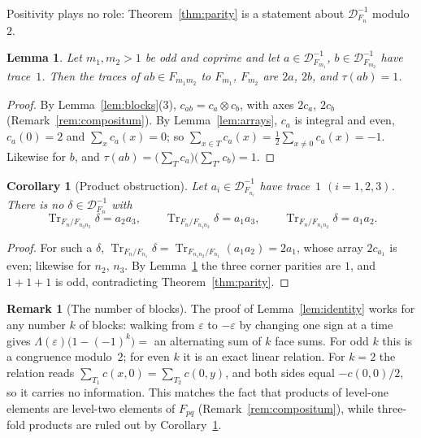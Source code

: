 \documentclass[11pt]{amsart}
\newcommand{\cod}[1]{\mathcal{D}_{#1}^{-1}}
\DeclareMathOperator{\Tr}{Tr}
\theoremstyle{plain}
\newtheorem{lemma}[theorem]{Lemma}
\newtheorem{corollary}[theorem]{Corollary}
\theoremstyle{definition}
\newtheorem{remark}[theorem]{Remark}
\begin{document}
Positivity plays no role: Theorem~\ref{thm:parity} is a statement about $\cod{F_n}$ modulo~$2$.

\begin{lemma}\label{lem:product-tau}
Let $m_1, m_2 > 1$ be odd and coprime and let $a \in \cod{F_{m_1}}$, $b \in \cod{F_{m_2}}$ have
trace~$1$. Then the traces of $ab \in F_{m_1m_2}$ to $F_{m_1}$, $F_{m_2}$ are $2a$, $2b$, and
$\tau(ab) = 1$.
\end{lemma}

\begin{proof}
By Lemma~\ref{lem:blocks}(3), $c_{ab} = c_a \otimes c_b$, with axes $2c_a$, $2c_b$
(Remark~\ref{rem:compositum}). By Lemma~\ref{lem:arrays}, $c_a$ is integral and even,
$c_a(0) = 2$ and $\sum_x c_a(x) = 0$; so $\sum_{x \in T} c_a(x) = \frac12\sum_{x \neq 0}c_a(x) = -1$.
Likewise for $b$, and $\tau(ab) = \bigl(\sum_T c_a\bigr)\bigl(\sum_{T'} c_b\bigr) = 1$.
\end{proof}

\begin{corollary}[Product obstruction]\label{cor:products}
Let $a_i \in \cod{F_{n_i}}$ have trace~$1$ $(i = 1,2,3)$. There is no $\delta \in \cod{F_n}$ with
\[
  \Tr_{F_n/F_{n_2n_3}}\delta = a_2a_3,\qquad \Tr_{F_n/F_{n_1n_3}}\delta = a_1a_3,\qquad
  \Tr_{F_n/F_{n_1n_2}}\delta = a_1a_2 .
\]
\end{corollary}

\begin{proof}
For such a $\delta$, $\Tr_{F_n/F_{n_1}}\delta = \Tr_{F_{n_1n_2}/F_{n_1}}(a_1a_2) = 2a_1$, whose array
$2c_{a_1}$ is even; likewise for $n_2$, $n_3$. By Lemma~\ref{lem:product-tau} the three corner
parities are $1$, and $1 + 1 + 1$ is odd, contradicting Theorem~\ref{thm:parity}.
\end{proof}

\begin{remark}[The number of blocks]\label{rem:blocks}
The proof of Lemma~\ref{lem:identity} works for any number $k$ of blocks: walking from
$\varepsilon$ to $-\varepsilon$ by changing one sign at a time gives
$\Lambda(\varepsilon)\bigl(1 - (-1)^k\bigr) = $ an alternating sum of $k$ face sums. For odd $k$
this is a congruence modulo~$2$; for even $k$ it is an exact linear relation. For $k = 2$ the
relation reads $\sum_{T_1}c(x,0) = \sum_{T_2}c(0,y)$, and both sides equal $-c(0,0)/2$, so it
carries no information. This matches the fact that products of level-one elements are level-two
elements of $F_{pq}$ (Remark~\ref{rem:compositum}), while three-fold products are ruled out by
Corollary~\ref{cor:products}.
\end{remark}
\end{document}
